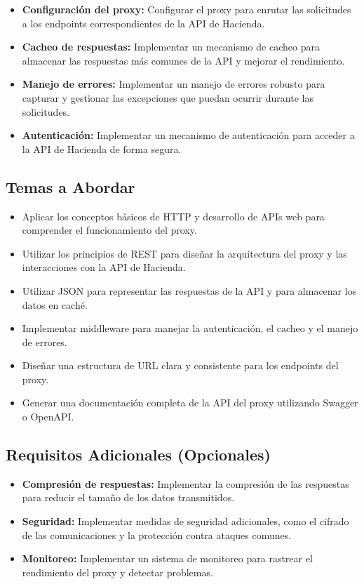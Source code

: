 \documentclass[
]{agujournal2019}
\begin{document}
\begin{itemize}
\item
  \textbf{Configuración del proxy:} Configurar el proxy para enrutar las
  solicitudes a los endpoints correspondientes de la API de Hacienda.
\item
  \textbf{Cacheo de respuestas:} Implementar un mecanismo de cacheo para
  almacenar las respuestas más comunes de la API y mejorar el
  rendimiento.
\item
  \textbf{Manejo de errores:} Implementar un manejo de errores robusto
  para capturar y gestionar las excepciones que puedan ocurrir durante
  las solicitudes.
\item
  \textbf{Autenticación:} Implementar un mecanismo de autenticación para
  acceder a la API de Hacienda de forma segura.
\end{itemize}

\subsection{Temas a Abordar}\label{temas-a-abordar}

\begin{itemize}
\item
  Aplicar los conceptos básicos de HTTP y desarrollo de APIs web para
  comprender el funcionamiento del proxy.
\item
  Utilizar los principios de REST para diseñar la arquitectura del proxy
  y las interacciones con la API de Hacienda.
\item
  Utilizar JSON para representar las respuestas de la API y para
  almacenar los datos en caché.
\item
  Implementar middleware para manejar la autenticación, el cacheo y el
  manejo de errores.
\item
  Diseñar una estructura de URL clara y consistente para los endpoints
  del proxy.
\item
  Generar una documentación completa de la API del proxy utilizando
  Swagger o OpenAPI.
\end{itemize}

\subsection{Requisitos Adicionales
(Opcionales)}\label{requisitos-adicionales-opcionales}

\begin{itemize}
\item
  \textbf{Compresión de respuestas:} Implementar la compresión de las
  respuestas para reducir el tamaño de los datos transmitidos.
\item
  \textbf{Seguridad:} Implementar medidas de seguridad adicionales, como
  el cifrado de las comunicaciones y la protección contra ataques
  comunes.
\item
  \textbf{Monitoreo:} Implementar un sistema de monitoreo para rastrear
  el rendimiento del proxy y detectar problemas.
\end{itemize}
\end{document}
